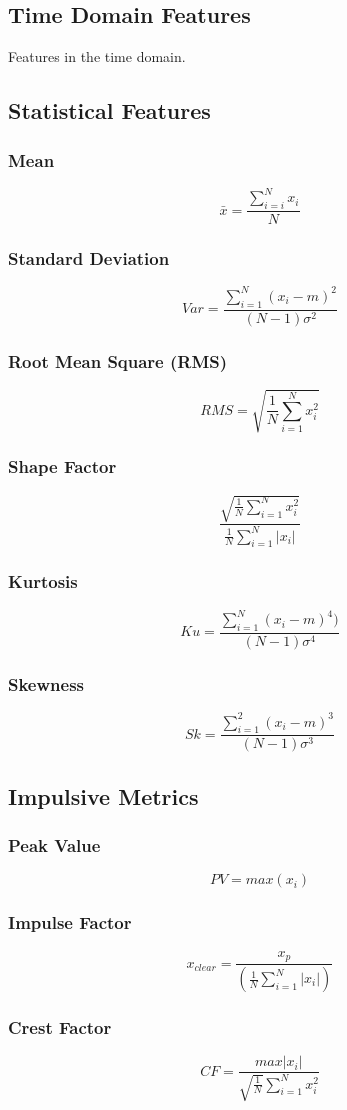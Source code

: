 \documentclass{article}
\begin{document}
\subsection{Time Domain Features} 	
Features in the time domain.
\subsection{Statistical Features}
\subsubsection{Mean}
$$ \bar{x} = \frac{\sum^N_{i=i} x_i}{N} $$
\subsubsection{Standard Deviation}  
$$ Var =\frac{\sum^N_{i=1}(x_i-m)^2}{(N-1)\sigma^2} $$
\subsubsection{Root Mean Square (RMS)}
$$ RMS = \sqrt{\frac{1}{N} \sum^N_{i=1}x^2_i} $$
\subsubsection{Shape Factor}
$$ \frac{ \sqrt{\frac{1}{N} \sum^N_{i=1}x_i^2} }  {\frac{1}{N}\sum^N_{i=1}|x_i|} $$
\subsubsection{Kurtosis} 
$$ Ku = \frac{\sum^N_{i=1}(x_i-m)^4)}{(N-1)\sigma^4} $$ 
\subsubsection{Skewness} 
$$ Sk = \frac{\sum^2_{i=1}(x_i-m)^3}{(N-1)\sigma^3} $$
  
\subsection{Impulsive Metrics}  
\subsubsection{Peak Value}
$$ PV = max(x_i) $$ 
\subsubsection{Impulse Factor} 
$$ x_{clear} = \frac{x_p}{(\frac{1}{N}\sum^N_{i=1}|x_i|)} $$  
\subsubsection{Crest Factor} 
$$ CF = \frac{max|x_i|}{\sqrt{\frac{1}{N}}\sum^N_{i=1}x^2_i} $$
\end{document}
